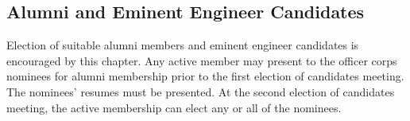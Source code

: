 \subsection{Alumni and Eminent Engineer Candidates} \label{VI.2}

Election of suitable
alumni members and eminent engineer candidates is encouraged by this chapter. Any
active member may present to the officer corps nominees for alumni membership prior to
the first election of candidates meeting. The nominees’ resumes must be presented. At the
second election of candidates meeting, the active membership can elect any or all of the
nominees.